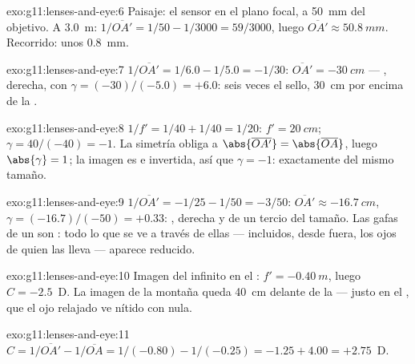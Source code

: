 \begin{solution}{exo:g11:lenses-and-eye:6}
Paisaje: el sensor en el plano focal, a \qty{50}{mm} del objetivo. A
\qty{3.0}{m}: $1/\overline{OA'} = 1/50 - 1/3000 = 59/3000$, luego
$\overline{OA'} \approx \qty{50.8}{mm}$. Recorrido: unos \qty{0.8}{mm}.
\end{solution}

\begin{solution}{exo:g11:lenses-and-eye:7}
$1/\overline{OA'} = 1/6.0 - 1/5.0 = -1/30$:
$\overline{OA'} = \qty{-30}{cm}$ --- , derecha, con
$\gamma = (-30)/(-5.0) = +6.0$: seis veces el sello, \qty{30}{cm} por
encima de la .
\end{solution}

\begin{solution}{exo:g11:lenses-and-eye:8}
$1/f' = 1/40 + 1/40 = 1/20$: $f' = \qty{20}{cm}$;
$\gamma = 40/(-40) = -1$. La simetría obliga a
$\abs{\overline{OA'}} = \abs{\overline{OA}}$, luego
$\abs{\gamma} = 1$; la imagen es  e invertida, así que
$\gamma = -1$: exactamente del mismo tamaño.
\end{solution}

\begin{solution}{exo:g11:lenses-and-eye:9}
$1/\overline{OA'} = -1/25 - 1/50 = -3/50$:
$\overline{OA'} \approx \qty{-16.7}{cm}$,
$\gamma = (-16.7)/(-50) = +0.33$: , derecha y de un tercio del
tamaño. Las gafas de un  son : todo lo que se ve a
través de ellas --- incluidos, desde fuera, los ojos de quien las lleva
--- aparece reducido.
\end{solution}

\begin{solution}{exo:g11:lenses-and-eye:10}
Imagen del infinito en el : $f' = \qty{-0.40}{m}$, luego
$C = -2.5$~D. La imagen de la montaña queda \qty{40}{cm} delante de la
 --- justo en el , que el ojo relajado ve nítido con
 nula.
\end{solution}

\begin{solution}{exo:g11:lenses-and-eye:11}
$C = 1/\overline{OA'} - 1/\overline{OA} = 1/(-0.80) - 1/(-0.25)
= -1.25 + 4.00 = +2.75$~D.
\end{solution}

